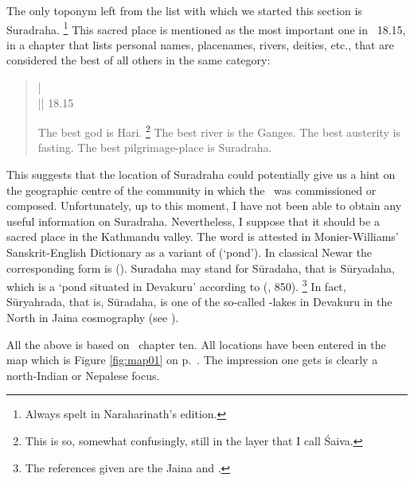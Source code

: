 The only toponym left from the list with which
we started this section is Suradraha.%
	\footnote{Always spelt  in Naraharinath's
			edition.}
This sacred place is mentioned as the most important
one in \VSS\ 18.15, in a chapter that lists personal names,
placenames, rivers, deities, etc., that are considered the
best  of all others in the same category:

\begin{quote}
 |\\
 || 18.15 

The best god is Hari.%
		\footnote{This is so, somewhat confusingly, still in the
		layer that I call Śaiva.}
The best river is the Ganges.
The best austerity is fasting. The best pilgrimage-place is Suradraha.
\end{quote}

\noindent
This suggests that the location of Suradraha could potentially
give us a hint on the geographic centre of 
the community in which the \VSS\ was commissioned
or composed. Unfortunately, up to this moment, I have
not been able to obtain any useful information on Suradraha. Nevertheless,
I suppose that it should be  a sacred place in the 
Kathmandu valley. The word  is attested in
Monier-Williams' Sanskrit-English Dictionary 
as a variant of  (`pond').
In classical Newar the corresponding form is 
(). Suradaha may stand for Sūradaha,
that is Sūryadaha, which is a `pond situated in Devakuru' 
according to \citeauthor{PrakritProperNames2} (\citeyear{PrakritProperNames2}, 850).%
	\footnote{The references given are the Jaina 
			 and .} 
In fact, Sūryahrada, that is, Sūradaha, is one of the 
so-called -lakes in Devakuru in the North
in Jaina cosmography (see ).
 
All the above is based on \VSS\ chapter ten. All locations have
 been entered in the map which is Figure \ref{fig:map01} on
 p.~\pageref{fig:map01}.
 The impression one gets is clearly a north-Indian or
 Nepalese focus.
 
